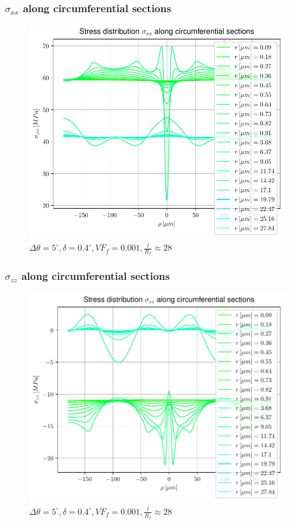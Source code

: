 \documentclass[first,firstsupp,lastsupp,handout,last,hyperref,table]{ETHclass}
\begin{document}
\begin{frame}
\frametitle{$\sigma_{xx}$ along circumferential sections}
\vspace{-0.35cm}
\centering
\captionsetup[subfigure]{font=scriptsize,labelfont=scriptsize}
\begin{figure}[!h]
\centering
\includegraphics[height=0.7\textheight]{AllCircumferentialSections-S11.pdf}
 \caption{$\Delta\theta=5^{\circ},\delta=0.4^{\circ},VF_{f}=0.001,\frac{l}{R_{f}}\approx28$}
  \label{fig:allcircumS11}
\end{figure}
\end{frame}

\begin{frame}
\frametitle{$\sigma_{zz}$ along circumferential sections}
\vspace{-0.35cm}
\centering
\captionsetup[subfigure]{font=scriptsize,labelfont=scriptsize}
\begin{figure}[!h]
\centering
\includegraphics[height=0.7\textheight]{AllCircumferentialSections-S22.pdf}
 \caption{$\Delta\theta=5^{\circ},\delta=0.4^{\circ},VF_{f}=0.001,\frac{l}{R_{f}}\approx28$}
  \label{fig:allcircumS22}
\end{figure}
\end{frame}
\end{document}
